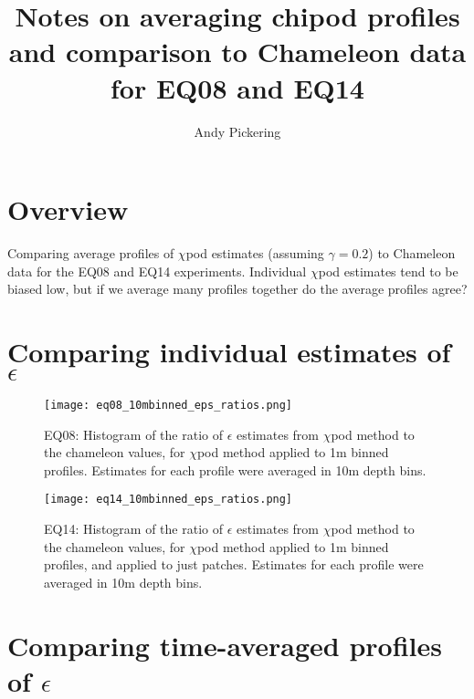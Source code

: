 \documentclass[11pt]{article}
\title{Notes on averaging chipod profiles and comparison to Chameleon data for EQ08 and EQ14}
\author{Andy Pickering}
\begin{document}
\maketitle

\tableofcontents
\newpage

\section{Overview}

Comparing average profiles of $\chi$pod estimates (assuming $\gamma=0.2$) to Chameleon data for the EQ08 and EQ14 experiments. Individual $\chi$pod estimates tend to be biased low, but if we average many profiles together do the average profiles agree?



\clearpage
\section{Comparing individual estimates of $\epsilon$}


\begin{figure}[htbp]
\texttt{[image: eq08\_10mbinned\_eps\_ratios.png]}
\caption{EQ08: Histogram of the ratio of $\epsilon$ estimates from $\chi$pod method to the chameleon values, for $\chi$pod method applied to 1m binned profiles. Estimates for each profile were averaged in 10m depth bins.}
\label{epsrathist_eq08}
\end{figure}


\begin{figure}[htbp]
\texttt{[image: eq14\_10mbinned\_eps\_ratios.png]}
\caption{EQ14: Histogram of the ratio of $\epsilon$ estimates from $\chi$pod method to the chameleon values, for $\chi$pod method applied to 1m binned profiles, and applied to just patches. Estimates for each profile were averaged in 10m depth bins.}
\label{epsrathist_eq14}
\end{figure}



\clearpage
\section{Comparing time-averaged profiles of $\epsilon$}
\end{document}
